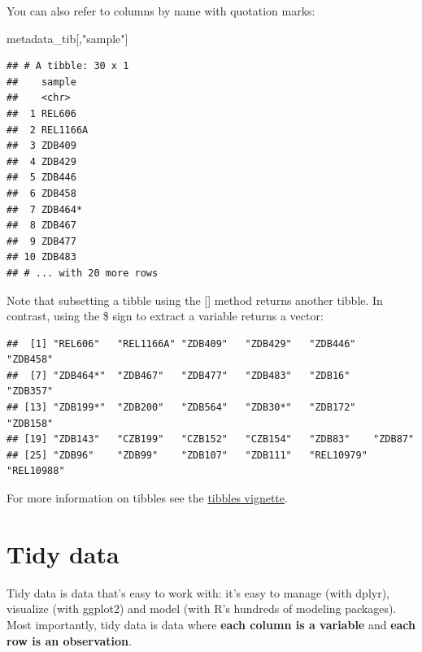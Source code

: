 \documentclass[
]{book}
\newenvironment{Shaded}{\begin{snugshade}}{\end{snugshade}}
\newcommand{\NormalTok}[1]{#1}
\newcommand{\SpecialCharTok}[1]{\textcolor[rgb]{0.00,0.00,0.00}{#1}}
\newcommand{\StringTok}[1]{\textcolor[rgb]{0.31,0.60,0.02}{#1}}
\begin{document}
You can also refer to columns by name with quotation marks:

\begin{Shaded}
\begin{Highlighting}[]
\NormalTok{metadata\_tib[,}\StringTok{"sample"}\NormalTok{]}
\end{Highlighting}
\end{Shaded}

\begin{verbatim}
## # A tibble: 30 x 1
##    sample  
##    <chr>   
##  1 REL606  
##  2 REL1166A
##  3 ZDB409  
##  4 ZDB429  
##  5 ZDB446  
##  6 ZDB458  
##  7 ZDB464* 
##  8 ZDB467  
##  9 ZDB477  
## 10 ZDB483  
## # ... with 20 more rows
\end{verbatim}

Note that subsetting a tibble using the {[}{]} method returns another tibble. In contrast, using the \$ sign to extract a variable returns a vector:

\begin{Shaded}
\end{Shaded}

\begin{verbatim}
##  [1] "REL606"   "REL1166A" "ZDB409"   "ZDB429"   "ZDB446"   "ZDB458"  
##  [7] "ZDB464*"  "ZDB467"   "ZDB477"   "ZDB483"   "ZDB16"    "ZDB357"  
## [13] "ZDB199*"  "ZDB200"   "ZDB564"   "ZDB30*"   "ZDB172"   "ZDB158"  
## [19] "ZDB143"   "CZB199"   "CZB152"   "CZB154"   "ZDB83"    "ZDB87"   
## [25] "ZDB96"    "ZDB99"    "ZDB107"   "ZDB111"   "REL10979" "REL10988"
\end{verbatim}

For more information on tibbles see the \href{https://cran.r-project.org/web/packages/tibble/vignettes/tibble.html}{tibbles vignette}.

\hypertarget{tidy-data}{%
\section{Tidy data}\label{tidy-data}}

Tidy data is data that's easy to work with: it's easy to manage (with dplyr), visualize (with ggplot2) and model (with R's hundreds of modeling packages). Most importantly, tidy data is data where \textbf{each column is a variable} and \textbf{each row is an observation}.
\end{document}
